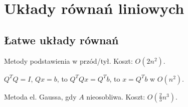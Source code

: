 \section{Układy równań liniowych}

\subsection{Łatwe układy równań}

\entry
Metody podstawienia w przód/tył. Koszt: $O(2n^2)$.

\entry
$Q^TQ=I$, $Qx=b$, to $Q^TQx=Q^Tb$, to $x=Q^Tb$ w $O(n^2)$.



\entry
Metoda el. Gaussa, gdy $A$ nieosobliwa. Koszt: $O(\frac{2}{3}n^3)$.
